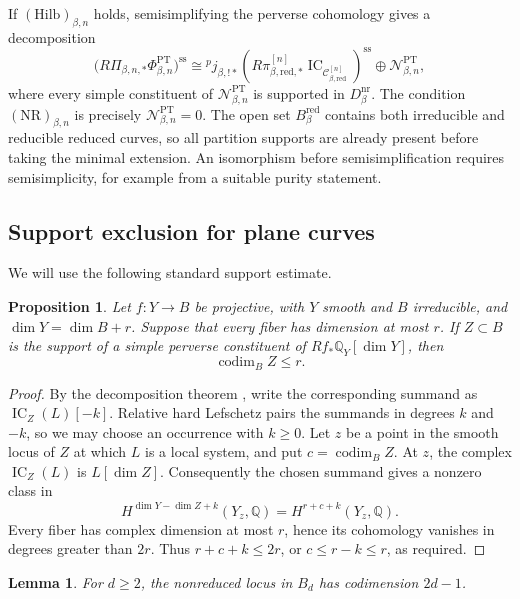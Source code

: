 \documentclass[11pt,reqno]{amsart}
\newtheorem{proposition}[theorem]{Proposition}
\newtheorem{lemma}[theorem]{Lemma}
\theoremstyle{definition}
\newcommand{\Q}{\mathbb Q}
\newcommand{\IC}{\operatorname{IC}}
\newcommand{\codim}{\operatorname{codim}}
\newcommand{\PT}{\operatorname{PT}}
\newcommand{\red}{\mathrm{red}}
\newcommand{\nr}{\mathrm{nr}}
\begin{document}
If $(\mathrm{Hilb})_{\beta,n}$ holds, semisimplifying the perverse cohomology
gives a decomposition
\begin{equation}\label{eq:pt-minimal-extension}
 \bigl(R\Pi_{\beta,n,*}\Phi_{\beta,n}^{\PT}\bigr)^{\mathrm{ss}}
 \cong{}^pj_{\beta,!*}
 \left(R\pi_{\beta,\red,*}^{[n]}
 \IC_{\mathcal C_{\beta,\red}^{[n]}}\right)^{\mathrm{ss}}
 \oplus\mathcal N_{\beta,n}^{\PT},
\end{equation}
where every simple constituent of $\mathcal N_{\beta,n}^{\PT}$ is supported
in $D_\beta^{\nr}$.  The condition $(\mathrm{NR})_{\beta,n}$ is precisely
$\mathcal N_{\beta,n}^{\PT}=0$.  The open set $B_\beta^{\red}$ contains both
irreducible and reducible reduced curves, so all partition supports are
already present before taking the minimal extension.  An isomorphism before
semisimplification requires semisimplicity, for example from a suitable
purity statement.

\subsection{Support exclusion for plane curves}

We will use the following standard support estimate.

\begin{proposition}\label{prop:support-bound}
Let $f:Y\to B$ be projective, with $Y$ smooth and $B$ irreducible, and
$\dim Y=\dim B+r$.  Suppose that every fiber has dimension at most $r$.
If $Z\subset B$ is the support of a simple perverse constituent of
$Rf_*\Q_Y[\dim Y]$, then
\[
  \codim_B Z\le r.
\]
\end{proposition}

\begin{proof}
By the decomposition theorem \cite{BBD}, write the corresponding summand as
$\IC_Z(L)[-k]$.  Relative hard Lefschetz pairs the summands in degrees $k$
and $-k$, so we may choose an occurrence with $k\ge0$.  Let $z$ be a point
in the smooth locus of $Z$ at which $L$ is a local system, and put
$c=\codim_BZ$.  At $z$, the complex $\IC_Z(L)$ is $L[\dim Z]$.
Consequently the chosen summand gives a nonzero class in
\[
 H^{\dim Y-\dim Z+k}(Y_z,\Q)
 =H^{r+c+k}(Y_z,\Q).
\]
Every fiber has complex dimension at most $r$, hence its cohomology vanishes
in degrees greater than $2r$.  Thus $r+c+k\le2r$, or
$c\le r-k\le r$, as required.
\end{proof}

\begin{lemma}\label{lem:plane-nonreduced-codim}
For $d\ge2$, the nonreduced locus in $B_d$ has codimension $2d-1$.
\end{lemma}
\end{document}
